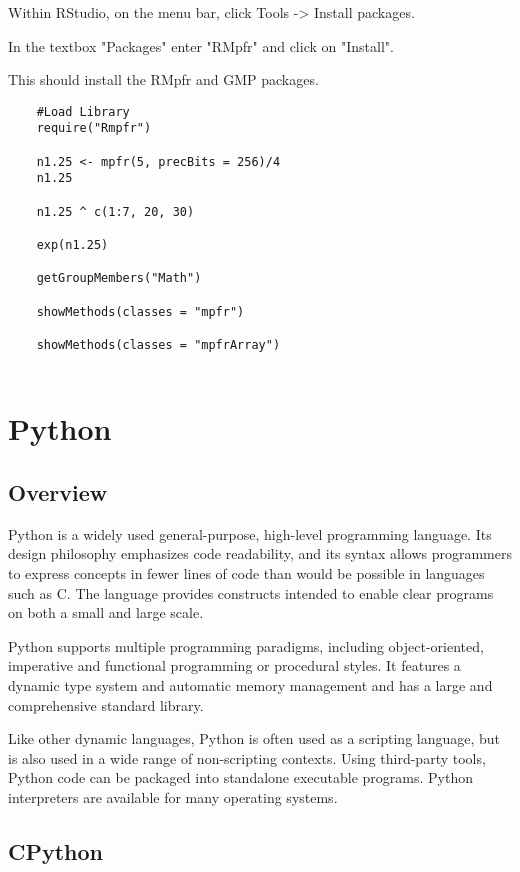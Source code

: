 	Within RStudio, on the menu bar, click Tools -> Install packages.
	
	In the textbox "Packages" enter "RMpfr" and click on "Install".
	
	This should install the RMpfr and GMP packages.
	
	\begin{lstlisting}
	#Load Library
	require("Rmpfr")
	
	n1.25 <- mpfr(5, precBits = 256)/4
	n1.25
	
	n1.25 ^ c(1:7, 20, 30)
	
	exp(n1.25)
	
	getGroupMembers("Math")
	
	showMethods(classes = "mpfr")
	
	showMethods(classes = "mpfrArray")
	
	\end{lstlisting}
	
	


\chapter{Python} 

\section{Overview}
Python is a widely used general-purpose, high-level programming language. Its design philosophy emphasizes code readability, and its syntax allows programmers to express concepts in fewer lines of code than would be possible in languages such as C. The language provides constructs intended to enable clear programs on both a small and large scale.

\vpara
Python supports multiple programming paradigms, including object-oriented, imperative and functional programming or procedural styles. It features a dynamic type system and automatic memory management and has a large and comprehensive standard library.

\vpara
Like other dynamic languages, Python is often used as a scripting language, but is also used in a wide range of non-scripting contexts. Using third-party tools, Python code can be packaged into standalone executable programs. Python interpreters are available for many operating systems.






\newpage
\section{CPython}

